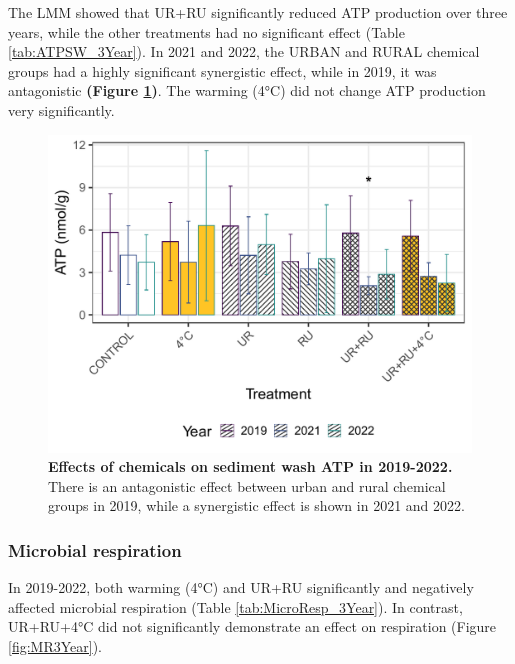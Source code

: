 \documentclass[11pt, a4paper]{article}
\begin{document}
\begin{spacing}{1.5}
The LMM showed that UR+RU significantly reduced ATP production over three years, while the other treatments had no significant effect (Table \ref{tab:ATPSW_3Year}). In 2021 and 2022, the URBAN and RURAL chemical groups had a highly significant synergistic effect, while in 2019, it was antagonistic \textbf{(Figure \ref{fig:ATPSW3Year})}. The warming (4°C) did not change ATP production very significantly.

\begin{figure}[H]
    \centering
    \includegraphics[scale=0.55]{./Figures/ATPSW3Year_barplot_corrected}
    \caption{\textbf{Effects of chemicals on sediment wash ATP in 2019-2022.} There is an antagonistic effect between urban and rural chemical groups in 2019, while a synergistic effect is shown in 2021 and 2022.}
    \label{fig:ATPSW3Year}
\end{figure}

\subsubsection{Microbial respiration}

In 2019-2022, both warming (4°C) and UR+RU significantly and negatively affected microbial respiration (Table \ref{tab:MicroResp_3Year}). In contrast, UR+RU+4°C did not significantly demonstrate an effect on respiration (Figure \ref{fig:MR3Year}).


\end{spacing}
\end{document}
